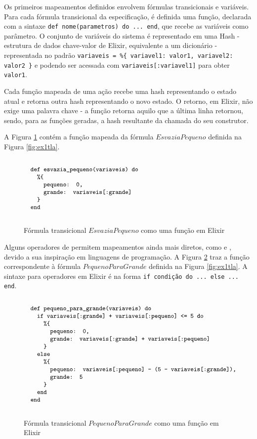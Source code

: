Os primeiros mapeamentos definidos envolvem fórmulas transicionais e variáveis. Para cada fórmula transicional da especificação, é definida uma função, declarada com a sintaxe \texttt{def nome(parametros) do ... end}, que recebe as variáveis como parâmetro. O conjunto de variáveis do sistema é representado em uma Hash - estrutura de dados chave-valor de Elixir, equivalente a um dicionário - representada no padrão \texttt{variaveis = \%\{ variavel1: valor1, variavel2: valor2 \}} e podendo ser acessada com \texttt{variaveis[:variavel1]} para obter \texttt{valor1}.

Cada função mapeada de uma ação recebe uma hash representando o estado atual e retorna outra hash representando o novo estado. O retorno, em Elixir, não exige uma palavra chave - a função retorna aquilo que a última linha retornou, sendo, para as funções geradas, a hash resultante da chamada do seu construtor.

A Figura \ref{fig:esvaziapequeno-elixir} contém a função mapeada da fórmula $EsvaziaPequeno$ definida na Figura \ref{fig:ex1tla}.

\begin{figure}[h]
  \centering
  $\progfig{
  ~~def esvazia\_pequeno(variaveis) do\\
  ~~~~\%\{\\
  ~~~~~~pequeno: 0,\\
  ~~~~~~grande: variaveis[:grande]\\
  ~~~~\}\\
  ~~end
  }$
  \caption{Fórmula transicional $EsvaziaPequeno$ como uma função em Elixir}
\label{fig:esvaziapequeno-elixir}
\end{figure}

Alguns operadores de \TLA permitem mapeamentos ainda mais diretos, como \IF e \CASE, devido a sua inspiração em linguagens de programação. A Figura \ref{fig:pequenoparagrande-elixir} traz a função correspondente à fórmula $PequenoParaGrande$ definida na Figura \ref{fig:ex1tla}. A sintaxe para operadores \IF em Elixir é na forma \texttt{if condição do ... else ... end}.

\begin{figure}[h]
  \centering
  $\progfig{
  ~~def pequeno\_para\_grande(variaveis) do\\
  ~~~~if variaveis[:grande] + variaveis[:pequeno] <= 5 do\\
  ~~~~~~\%\{\\
  ~~~~~~~~pequeno: 0,\\
  ~~~~~~~~grande: variaveis[:grande] + variaveis[:pequeno]\\
  ~~~~~~\}\\
  ~~~~else\\
  ~~~~~~\%\{\\
  ~~~~~~~~pequeno: variaveis[:pequeno] - (5 - variaveis[:grande]),\\
  ~~~~~~~~grande: 5\\
  ~~~~~~\}\\
  ~~~~end\\
  ~~end
  }$
  \caption{Fórmula transicional $PequenoParaGrande$ como uma função em Elixir}
\label{fig:pequenoparagrande-elixir}
\end{figure}

